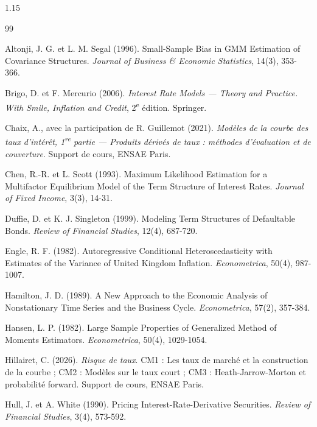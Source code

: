 \renewcommand{\refname}{Bibliographie}
\begin{spacing}{1.15}
\begin{thebibliography}{99}
\small

Altonji, J. G. et L. M. Segal (1996). Small-Sample Bias in GMM Estimation of Covariance Structures.
\emph{Journal of Business \& Economic Statistics}, 14(3), 353-366.

Brigo, D. et F. Mercurio (2006). \emph{Interest Rate Models — Theory and Practice. With Smile, Inflation and
Credit}, 2\textsuperscript{e} édition. Springer.

Chaix, A., avec la participation de R. Guillemot (2021). \emph{Modèles de la courbe des taux d'intérêt,
1\textsuperscript{re} partie — Produits dérivés de taux : méthodes d'évaluation et de couverture}. Support de
cours, ENSAE Paris.

Chen, R.-R. et L. Scott (1993). Maximum Likelihood Estimation for a Multifactor Equilibrium Model of the Term
Structure of Interest Rates. \emph{Journal of Fixed Income}, 3(3), 14-31.

Duffie, D. et K. J. Singleton (1999). Modeling Term Structures of Defaultable Bonds. \emph{Review of Financial
Studies}, 12(4), 687-720.

Engle, R. F. (1982). Autoregressive Conditional Heteroscedasticity with Estimates of the Variance of United
Kingdom Inflation. \emph{Econometrica}, 50(4), 987-1007.

Hamilton, J. D. (1989). A New Approach to the Economic Analysis of Nonstationary Time Series and the Business
Cycle. \emph{Econometrica}, 57(2), 357-384.

Hansen, L. P. (1982). Large Sample Properties of Generalized Method of Moments Estimators. \emph{Econometrica},
50(4), 1029-1054.

Hillairet, C. (2026). \emph{Risque de taux}. CM1 : Les taux de marché et la construction de la courbe ; CM2 :
Modèles sur le taux court ; CM3 : Heath-Jarrow-Morton et probabilité forward. Support de cours, ENSAE Paris.

Hull, J. et A. White (1990). Pricing Interest-Rate-Derivative Securities. \emph{Review of Financial Studies},
3(4), 573-592.


\end{thebibliography}
\end{spacing}
